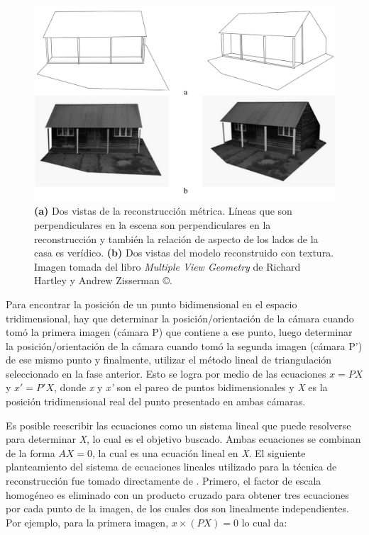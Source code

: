 \begin{figure}[H]
\centering
\includegraphics[width=1.0\textwidth]{images/metricreconstruction.png}
\caption[Reconstrucci\'{o}n m\'{e}trica]%
{\textbf{(a)} Dos vistas de la reconstrucci\'{o}n m\'{e}trica. L\'{i}neas que son perpendiculares en la escena son perpendiculares en la reconstrucci\'{o}n y tambi\'{e}n la relaci\'{o}n de aspecto de los lados de la casa es ver\'{i}dico. \textbf{(b)} Dos vistas del modelo reconstruido con textura. Imagen tomada del libro \textit{Multiple View Geometry} de Richard Hartley y Andrew Zisserman \copyright.}
\label{fig:MetricReconstruction}
\end{figure}


Para encontrar la posición de un punto bidimensional en el espacio tridimensional, hay que determinar la posici\'{o}n/orientaci\'{o}n de la c\'{a}mara cuando tom\'{o} la primera imagen (c\'{a}mara P) que contiene a ese punto, luego determinar la posici\'{o}n/orientaci\'{o}n de la c\'{a}mara cuando tom\'{o} la segunda imagen (c\'{a}mara P') de ese mismo punto y finalmente, utilizar el m\'{e}todo lineal de triangulaci\'{o}n seleccionado en la fase anterior. Esto se logra por medio de las ecuaciones $x = PX$ y $x' = P'X$, donde \textit{x} y \textit{x'} son el pareo de puntos bidimensionales y \textit{X} es la posici\'{o}n tridimensional real del punto presentado en ambas c\'{a}maras.

Es posible reescribir las ecuaciones como un sistema lineal que puede resolverse para determinar \textit{X}, lo cual es el objetivo buscado. Ambas ecuaciones se combinan de la forma $AX = 0$, la cual es una ecuaci\'{o}n lineal en \textit{X}. El siguiente planteamiento del sistema de ecuaciones lineales utilizado para la t\'{e}cnica de reconstrucci\'{o}n fue tomado directamente de \cite{Hartley_Zisserman_2003}. Primero, el factor de escala homog\'{e}neo es eliminado con un producto cruzado para obtener tres ecuaciones por cada punto de la imagen, de los cuales dos son linealmente independientes. Por ejemplo, para la primera imagen, $x \times (PX) = 0$ lo cual da:


